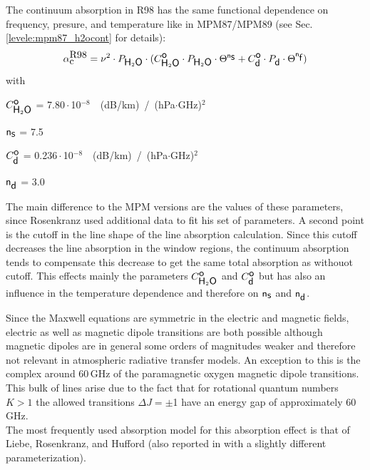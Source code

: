 {
\label{levele:pwr98_h2ocont}
The continuum absorption in R98 has the same functional dependence on frequency,
presure, and temperature like in MPM87/MPM89 (see Sec. \ref{levele:mpm87_h2ocont}
for details):
\begin{equation} 
  \label{eq:pwr98:abscont}
  \alpha^{\mbox{\rm R98}}_{\mbox{c}} = \nu^2 \cdot P_{\mbox{\sf H}_{2}\mbox{\sf O}} \cdot 
               (C^{\mbox{\sf o}}_{\mbox{\sf H}_{2}\mbox{\sf O}} \cdot P_{\mbox{\sf H}_{2}\mbox{\sf O}} \cdot \Theta^{{\sf n}_{\mbox{\sf s}}} + 
                C^{\mbox{\sf o}}_{\mbox{\sf d}} \cdot P_{\mbox{\sf d}}  \cdot \Theta^{{\sf n}_{\mbox{\sf f}}})
\end{equation}
with
\begin{description}
\item{$C^{\mbox{\sf o}}_{\mbox{\sf H}_{2}\mbox{\sf O}}$}   = 7.80\,$\cdot$\,10$^{-8}$~~(dB/km)~/~(hPa$\cdot$GHz)$^2$
\item{${\sf n}_{\mbox{\sf s}}$}    = 7.5
\item{$C^{\mbox{\sf o}}_{\mbox{\sf d}}$}   =  0.236\,$\cdot$\,10$^{-8}$~~(dB/km)~/~(hPa$\cdot$GHz)$^2$
\item{${\sf n}_{\mbox{\sf d}}$}    = 3.0
\end{description}
The main difference to the MPM versions are the values of these 
parameters, since Rosenkranz used additional data to fit his set of 
parameters. A second point is the cutoff in the line shape of the line 
absorption calculation. Since this cutoff decreases the line absorption 
in the window regions, the continuum absorption tends to compensate this 
decrease to get the same total absorption as withouot cutoff. This effects 
mainly the parameters $C^{\mbox{\sf o}}_{\mbox{\sf H}_{2}\mbox{\sf O}}$ and $C^{\mbox{\sf o}}_{\mbox{\sf d}}$ but has also an influence in the 
temperature dependence and therefore on ${\sf n}_{\mbox{\sf s}}$ and ${\sf n}_{\mbox{\sf d}}$.




\label{levelc:02_models}
%
Since the Maxwell equations are symmetric in the electric and
magnetic fields, electric as well as magnetic dipole transitions 
are both possible although magnetic dipoles are in general some
orders of magnitudes weaker and therefore not relevant in
atmospheric radiative transfer models. An exception to this is the complex 
around 60\,GHz of the paramagnetic oxygen magnetic dipole transitions. 
This bulk of lines arise due to the fact that for rotational 
quantum numbers $K>1$ the allowed transitions \mbox{$\Delta J = \pm$1} 
have an energy gap of approximately 60\,GHz.\\
The most frequently used absorption model for this absorption effect is that of
Liebe, Rosenkranz, and Hufford \cite{liebeetal:92} (also reported in 
\cite{pwr:93} with a slightly different parameterization).

}
